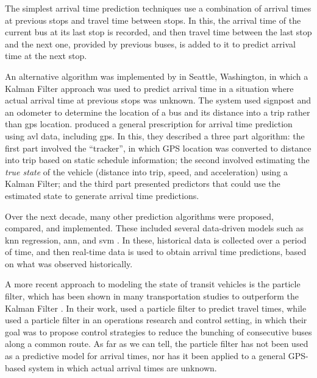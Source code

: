 \documentclass[12pt,a4paper]{article}
\begin{document}
The simplest arrival time prediction techniques use a combination of arrival times at previous stops
and travel time between stops.
In this, the arrival time of the current bus at its last stop is recorded, 
and then travel time between the last stop and the next one, provided by previous buses,
is added to it to predict arrival time at the next stop.

An alternative algorithm was implemented by \cite{dailey:2001} in Seattle, Washington,
in which a Kalman Filter approach was used to predict arrival time in a situation where
actual arrival time at previous stops was unknown.
The system used signpost and an odometer to determine the location of a bus and its 
distance into a trip rather than \gls{gps} location.
\cite{cathey-dailey:2003} produced a general prescription for arrival time prediction using
\gls{avl} data, including \gls{gps}.
In this, they described a three part algorithm:
the first part involved the ``tracker'', in which GPS location was converted to distance into trip
based on static schedule information;
the second involved estimating the \emph{true state} of the vehicle (distance into trip, speed, 
and acceleration) using a Kalman Filter;
and the third part presented predictors that could use the estimated state to generate arrival time predictions.


Over the next decade, many other prediction algorithms were proposed, compared, and implemented.
These included several data-driven models such as \gls{knn} regression,
\gls{ann}, and \gls{svm} 
\citep{chang-etal:2010,jeong-rilett:2005,yu-etal:2006,yu-etal:2010,yu-etal:2011}.
In these, historical data is collected over a period of time,
and then real-time data is used to obtain arrival time predictions, 
based on what was observed historically.


A more recent approach to modeling the state of transit vehicles is the particle filter,
which has been shown in many transportation studies to outperform the Kalman Filter
\citep{chen-rakha:2014,cn}.
In their work, \cite{chen-rakha:2014} used a particle filter to predict travel times,
while \cite{hans-etal:2015} used a particle filter in an operations research and control setting,
in which their goal was to propose control strategies to reduce the bunching of consecutive buses
along a common route.
As far as we can tell, the particle filter has not been used as a predictive model for
arrival times, nor has it been applied to a general GPS-based system in which actual arrival times
are unknown.
\end{document}
